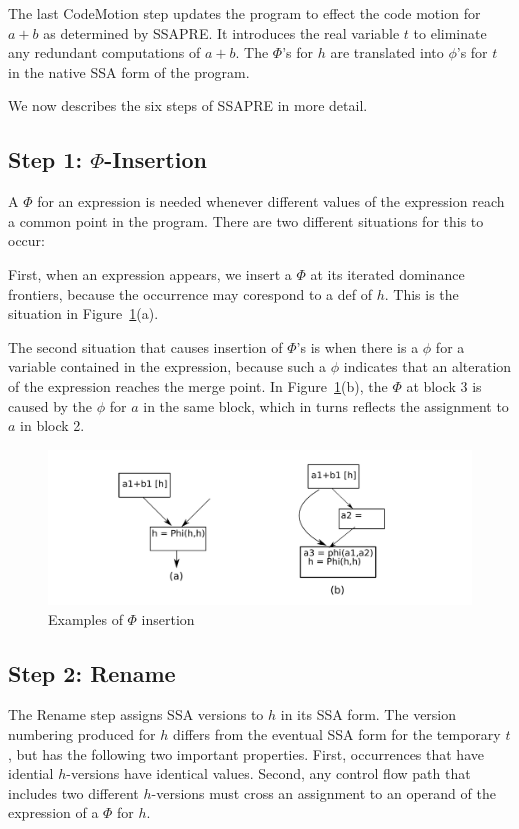 The last CodeMotion step updates the program to effect the code motion for
$a+b$ as determined by SSAPRE.  It introduces the real variable $t$
to eliminate any redundant computations of $a+b$.  The $\Phi$'s for $h$
are translated into $\phi$'s for $t$ in the native SSA form of the
program.

We now describes the six steps of SSAPRE in more detail.

\subsection{Step 1: $\Phi$-Insertion}

A $\Phi$ for an expression is needed whenever different values of the
expression reach a common point in the program.  There are two different
situations for this to occur:

First, when an expression appears, we insert a $\Phi$ at its iterated
dominance frontiers, because the occurrence may corespond to a def of $h$.
This is the situation in Figure~\ref{fig: phi-insertion}(a).

The second situation that causes insertion of $\Phi$'s is when there is a
$\phi$ for a variable contained in the expression, because such a $\phi$
indicates that an alteration of the expression reaches the merge point.
In Figure~\ref{fig: phi-insertion}(b), the $\Phi$ at block 3 is caused by
the $\phi$ for $a$ in the same block, which in turns reflects the
assignment to $a$ in block 2.

\begin{figure}
\centering
\includegraphics[scale=0.55]{fig-phi-insertion.pdf}
\caption{Examples of $\Phi$ insertion}
\label{fig: phi-insertion}
\end{figure}

\subsection{Step 2: Rename}

The Rename step assigns SSA versions to $h$ in its SSA form.  The version 
numbering produced for $h$ differs from the eventual SSA form for the 
temporary $t$, but has the following two important properties.  First,
occurrences that have idential $h$-versions have identical values.  Second,
any control flow path that includes two different $h$-versions must cross an
assignment to an operand of the expression of a $\Phi$ for $h$.

